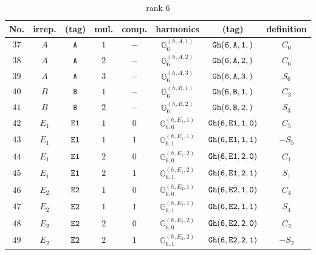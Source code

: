 \documentclass[fleqn,8pt]{jsarticle}
\begin{document}
\begin{table}[ht!]
\begin{center}
\caption{rank 6}
\renewcommand{\arraystretch}{1.3}
\begin{tabular}{cccccccc} \hline \hline
No. & irrep. & (tag) & mul. & comp. & harmonics & (tag) & definition \\ \hline
$ 37 $ & $ A $ & $ {\tt A} $ & $ 1 $ & $ - $ & $ \mathbb{G}_{6}^{(h,A,1)} $ & $ {\tt Gh(6,A,1,)} $ & $ C_{0} $ \\
$ 38 $ & $ A $ & $ {\tt A} $ & $ 2 $ & $ - $ & $ \mathbb{G}_{6}^{(h,A,2)} $ & $ {\tt Gh(6,A,2,)} $ & $ C_{6} $ \\
$ 39 $ & $ A $ & $ {\tt A} $ & $ 3 $ & $ - $ & $ \mathbb{G}_{6}^{(h,A,3)} $ & $ {\tt Gh(6,A,3,)} $ & $ S_{6} $ \\
$ 40 $ & $ B $ & $ {\tt B} $ & $ 1 $ & $ - $ & $ \mathbb{G}_{6}^{(h,B,1)} $ & $ {\tt Gh(6,B,1,)} $ & $ C_{3} $ \\
$ 41 $ & $ B $ & $ {\tt B} $ & $ 2 $ & $ - $ & $ \mathbb{G}_{6}^{(h,B,2)} $ & $ {\tt Gh(6,B,2,)} $ & $ S_{3} $ \\
$ 42 $ & $ E_{1} $ & $ {\tt E1} $ & $ 1 $ & $ 0 $ & $ \mathbb{G}_{6,0}^{(h,E_{1},1)} $ & $ {\tt Gh(6,E1,1,0)} $ & $ C_{5} $ \\
$ 43 $ & $ E_{1} $ & $ {\tt E1} $ & $ 1 $ & $ 1 $ & $ \mathbb{G}_{6,1}^{(h,E_{1},1)} $ & $ {\tt Gh(6,E1,1,1)} $ & $ - S_{5} $ \\
$ 44 $ & $ E_{1} $ & $ {\tt E1} $ & $ 2 $ & $ 0 $ & $ \mathbb{G}_{6,0}^{(h,E_{1},2)} $ & $ {\tt Gh(6,E1,2,0)} $ & $ C_{1} $ \\
$ 45 $ & $ E_{1} $ & $ {\tt E1} $ & $ 2 $ & $ 1 $ & $ \mathbb{G}_{6,1}^{(h,E_{1},2)} $ & $ {\tt Gh(6,E1,2,1)} $ & $ S_{1} $ \\
$ 46 $ & $ E_{2} $ & $ {\tt E2} $ & $ 1 $ & $ 0 $ & $ \mathbb{G}_{6,0}^{(h,E_{2},1)} $ & $ {\tt Gh(6,E2,1,0)} $ & $ C_{4} $ \\
$ 47 $ & $ E_{2} $ & $ {\tt E2} $ & $ 1 $ & $ 1 $ & $ \mathbb{G}_{6,1}^{(h,E_{2},1)} $ & $ {\tt Gh(6,E2,1,1)} $ & $ S_{4} $ \\
$ 48 $ & $ E_{2} $ & $ {\tt E2} $ & $ 2 $ & $ 0 $ & $ \mathbb{G}_{6,0}^{(h,E_{2},2)} $ & $ {\tt Gh(6,E2,2,0)} $ & $ C_{2} $ \\
$ 49 $ & $ E_{2} $ & $ {\tt E2} $ & $ 2 $ & $ 1 $ & $ \mathbb{G}_{6,1}^{(h,E_{2},2)} $ & $ {\tt Gh(6,E2,2,1)} $ & $ - S_{2} $ \\
 \hline \hline
\end{tabular}
\end{center}
\end{table}
\end{document}
